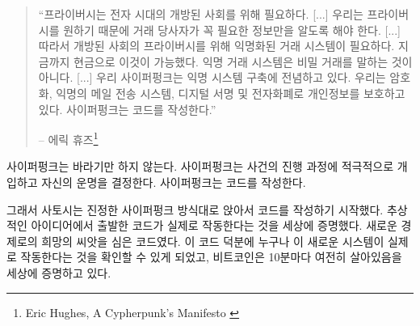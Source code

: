 \begin{quotation}\begin{samepage}
		\begin{comment}
			\enquote{Privacy is necessary for an open society in the electronic age.
				[...] Since we desire privacy, we must ensure that each party to a
				transaction have knowledge only of that which is directly necessary
				for that transaction. [...]
				Therefore, privacy in an open society requires anonymous transaction
				systems. Until now, cash has been the primary such system. An
				anonymous transaction system is not a secret transaction system.
				[...]
				We the Cypherpunks are dedicated to building anonymous systems. We are
				defending our privacy with cryptography, with anonymous mail
				forwarding systems, with digital signatures, and with electronic
				money.
				Cypherpunks write code.}
		\end{comment}
		\enquote{프라이버시는 전자 시대의 개방된 사회를 위해 필요하다. [...]
			우리는 프라이버시를 원하기 때문에 거래 당사자가 꼭 필요한 정보만을 알도록 해야 한다. [...]
			따라서 개방된 사회의 프라이버시를 위해 익명화된 거래 시스템이 필요하다.
			지금까지 현금으로 이것이 가능했다. 익명 거래 시스템은 비밀 거래를 말하는 것이 아니다. [...]
			우리 사이퍼펑크는 익명 시스템 구축에 전념하고 있다.
			우리는 암호화, 익명의 메일 전송 시스템, 디지털 서명 및 전자화폐로 개인정보를 보호하고 있다.
			사이퍼펑크는 코드를 작성한다.}
		\begin{flushright} -- 에릭 휴즈\footnote{Eric Hughes, A Cypherpunk's Manifesto \cite{cypherpunk-manifesto}}
\end{flushright}\end{samepage}\end{quotation}

\begin{comment}
	Cypherpunks do not find comfort in hopes and wishes. They actively
	interfere with the course of events and shape their own destiny.
	Cypherpunks write code.
\end{comment}
사이퍼펑크는 바라기만 하지 않는다.
사이퍼펑크는 사건의 진행 과정에 적극적으로 개입하고 자신의 운명을 결정한다.
사이퍼펑크는 코드를 작성한다.

\begin{comment}
	Thus, in true cypherpunk fashion, Satoshi sat down and started to write
	code. Code which took an abstract idea and proved to the world that it
	actually worked. Code which planted the seed of a new economic reality.
	Thanks to this code, everyone can verify that this novel system actually
	works, and every 10 minutes or so Bitcoin proofs to the world that it is
	still living.
\end{comment}
그래서 사토시는 진정한 사이퍼펑크 방식대로 앉아서 코드를 작성하기 시작했다.
추상적인 아이디어에서 출발한 코드가 실제로 작동한다는 것을 세상에 증명했다.
새로운 경제로의 희망의 씨앗을 심은 코드였다.
이 코드 덕분에 누구나 이 새로운 시스템이 실제로 작동한다는 것을 확인할 수 있게 되었고,
비트코인은 10분마다 여전히 살아있음을 세상에 증명하고 있다.

